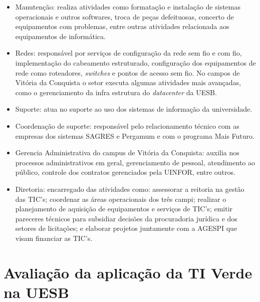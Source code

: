 \begin{itemize}
    \item Manutenção: realiza atividades como formatação e instalação de sistemas operacionais e outros softwares, troca de peças defeituosas, concerto de equipamentos com problemas, entre outras atividades relacionada aos equipamentos de informática.
    \item Redes: responsável por serviços de configuração da rede sem fio e com fio, implementação do cabeamento estruturado, configuração dos equipamentos de rede como roteadores, \textit{switches} e pontos de acesso sem fio. No campos de Vitória da Conquista o setor executa algumas atividades mais avançadas, como o gerenciamento da infra estrutura do \textit{datacenter} da UESB. 
    \item Suporte: atua no suporte ao uso dos sistemas de informação da universidade.
    \item Coordenação de suporte: responsável pelo relacionamento técnico com as empresas dos sistemas SAGRES e Pergamum e com o programa Mais Futuro.
    \item Gerencia Administrativa do campus de Vitória da Conquista: auxilia nos processos administrativos em geral, gerenciamento de pessoal, atendimento ao público, controle dos contratos gerenciados pela UINFOR, entre outros.
    \item Diretoria: encarregado das atividades como: assessorar a reitoria na gestão das TIC's; coordenar as áreas operacionais dos três campi; realizar o planejamento de aquisição de equipamentos e serviços de TIC's; emitir pareceres técnicos para subsidiar decisões da procuradoria jurídica e dos setores de licitações; e elaborar projetos juntamente com a AGESPI que visam financiar as TIC's.
\end{itemize}

\section{Avaliação da aplicação da TI Verde na UESB}


